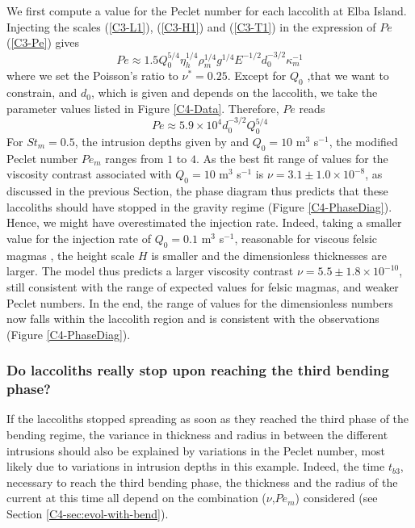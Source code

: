 We first compute  a value for the Peclet number  for each laccolith at
Elba  Island. Injecting  the scales  (\ref{C3-L1}), (\ref{C3-H1})  and
(\ref{C3-T1}) in the expression of $Pe$ (\ref{C3-Pe}) gives
\begin{equation}
  Pe \approx 1.5 Q_{0}^{5/4}\eta_{h}^{1/4}\rho_m^{1/4}g^{1/4}E^{-1/2} d_0^{-3/2} \kappa_m^{-1}
\end{equation}
where we  set the  Poisson's ratio to  $\nu^*=0.25$. Except  for $Q_0$
,that we want  to constrain, and $d_0$, which is  given and depends on
the  laccolith,  we  take  the   parameter  values  listed  in  Figure
\ref{C4-Data}.  Therefore, $Pe$ reads
\begin{equation}
  Pe \approx 5.9\times10^4 d_0^{-3/2} Q_0^{5/4}
  \label{PeExpre}
\end{equation}
For $St_m  =0.5$, the intrusion depths  given by \citet{Rocchi:2002jy}
and  $Q_0 =10$  m$^{3}$ s$^{-1}$,  the modified  Peclet number  $Pe_m$
ranges from  $1$ to  $4$.  As  the best  fit range  of values  for the
viscosity  contrast  associated  with  $Q_0=10$  m$^{3}$  s$^{-1}$  is
$\nu  = 3.1\pm  1.0  \times  10^{-8}$, as  discussed  in the  previous
Section, the phase diagram thus  predicts that these laccoliths should
have stopped in the gravity regime (Figure \ref{C4-PhaseDiag}). Hence,
we  might have  overestimated the  injection rate.   Indeed, taking  a
smaller value  for the injection  rate of $Q_0=0.1$  m$^{3}$ s$^{-1}$,
reasonable for viscous felsic magmas \citep{Harris:2000jd}, the height
scale $H$  is smaller  and the  dimensionless thicknesses  are larger.
The    model   thus    predicts    a    larger   viscosity    contrast
$\nu=5.5\pm1.8\times  10^{-10}$, still  consistent with  the range  of
expected values for felsic magmas,  and weaker Peclet numbers.  In the
end,  the range  of values  for  the dimensionless  numbers now  falls
within the  laccolith region and  is consistent with  the observations
(Figure \ref{C4-PhaseDiag}).

\subsubsection*{Do  laccoliths really  stop  upon  reaching the  third
  bending phase?}

If the laccoliths stopped spreading as  soon as they reached the third
phase of the  bending regime, the variance in thickness  and radius in
between  the   different  intrusions  should  also   be  explained  by
variations  in the  Peclet number,  most likely  due to  variations in
intrusion  depths  in  this   example.   Indeed,  the  time  $t_{b3}$,
necessary  to reach  the third  bending phase,  the thickness  and the
radius  of the  current at  this time  all depend  on the  combination
($\nu$,$Pe_m$) considered (see Section \ref{C4-sec:evol-with-bend}).

